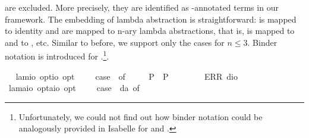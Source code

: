 \begin{isabellebody}
\begin{isamarkuptext}
  are excluded. More precisely, they are identified as -annotated 
  terms in our framework.
  The embedding of lambda abstraction is 
  straightforward:  is mapped to identity and  are mapped to n-ary
  lambda abstractions, that is,  is mapped to  and  
  to , etc.
  Similar to before, we support only the cases for $n\leq 3$. Binder notation is
  introduced for \isa{\isactrlbold {\isasymlambda}}.\footnote{Unfortunately, we could not find out how binder notation
  could be analogously provided in Isabelle for  and .}.%
\end{isamarkuptext}\isamarkuptrue%
\ \isamarkupfalse%
\ lam{}{\isacharcolon}{\isacharcolon}{\isachardoublequoteopen}io\ opt{\isasymRightarrow}io\ opt{\isachardoublequoteclose}\ {\isacharparenleft}{\isachardoublequoteopen}\isactrlbold {\isasymlambda}\ \ {\isachardoublequoteopen}\isactrlbold {\isasymlambda}\ {\isasymequiv}\ case\ {\isasymphi}\ of\ \isanewline
\ \ \ \ P{\isacharparenleft}{\isasympsi}{\isacharparenright}\ {\isasymRightarrow}\ P{\isacharparenleft}{\isasympsi}{\isacharparenright}\ {\isacharbar}\ \isanewline
\ \ \ \ {\isacharunderscore}\ {\isasymRightarrow}\ ERR\ dio{\isachardoublequoteclose}\ \ \isanewline
\ \isamarkupfalse%
\ lam{\isacharcolon}{\isacharcolon}{\isachardoublequoteopen}{\isacharparenleft}{\isacharprime}a{\isasymRightarrow}io\ opt{\isacharparenright}{\isasymRightarrow}{\isacharparenleft}{\isacharprime}a{\isasymRightarrow}io{\isacharparenright}\ opt{\isachardoublequoteclose}\ {\isacharparenleft}{\isachardoublequoteopen}\isactrlbold {\isasymlambda}{\isachardoublequoteclose}{\isacharparenright}\ \ {\isachardoublequoteopen}\isactrlbold {\isasymlambda}{\isasymPhi}\ {\isasymequiv}\ case\ {\isacharparenleft}{\isasymPhi}\ da{\isacharparenright}\ of\isanewline

\end{isabellebody}
